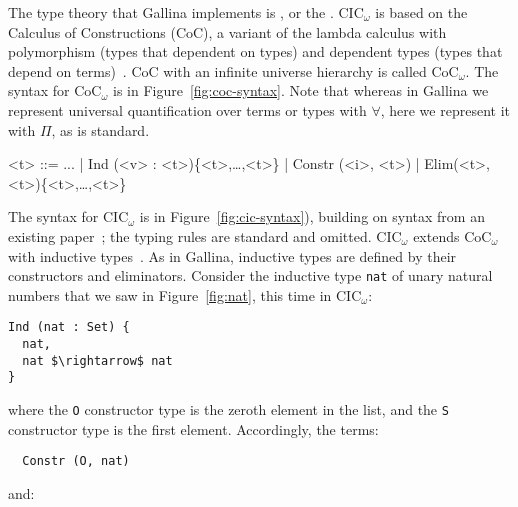 The type theory that Gallina implements is , or the .
CIC$_{\omega}$ is based on the Calculus of Constructions (CoC), a variant of the lambda calculus with polymorphism (types that dependent on types) and dependent types (types that depend on terms)~\cite{coquand:inria-00076024}.
CoC with an infinite universe hierarchy is called CoC$_{\omega}$. %
The syntax for CoC$_{\omega}$ is in Figure~\ref{fig:coc-syntax}.
Note that whereas in Gallina we represent universal quantification over terms or types with $\forall$, here we represent it with $\Pi$, as is standard.

\begin{figure*}
\small
\begin{grammar}
<t> ::= ... | \hspace{0.06cm} Ind (<v> : <t>)\{<t>,\ldots,<t>\} \hspace{0.06cm} | \hspace{0.06cm} Constr (<i>, <t>) \hspace{0.06cm} | \hspace{0.06cm} Elim(<t>, <t>)\{<t>,\ldots,<t>\}
\end{grammar}
\vspace{-0.3cm}
\caption{CIC$_\omega$ is CoC$_\omega$ with inductive types, inductive constructors, and .}
\label{fig:cic-syntax}
\end{figure*}

The syntax for CIC$_{\omega}$ is in Figure~\ref{fig:cic-syntax}), building on syntax from an existing paper~\cite{Timany2015FirstST};
the typing rules are standard and omitted. %
CIC$_{\omega}$ extends CoC$_{\omega}$ with inductive types~\cite{inductive}.
As in Gallina, inductive types are defined by their constructors and eliminators.
Consider the inductive type \lstinline{nat} of unary natural numbers that we saw in Figure~\ref{fig:nat},
this time in CIC$_{\omega}$: %

\begin{lstlisting}
Ind (nat : Set) {
  nat,
  nat $\rightarrow$ nat
}
\end{lstlisting}
where the \lstinline{O} constructor type is the zeroth element in the list, and the \lstinline{S} constructor type is the first element.
Accordingly, the terms:

\begin{lstlisting}
  Constr (O, nat)
\end{lstlisting}
and:

